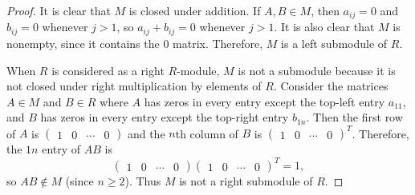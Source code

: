 \documentclass[10pt]{article}
\begin{document}
\begin{enumerate}
\begin{proof}
It is clear that $M$ is closed under addition.  If $A,B \in M$, then $a_{ij} = 0$ and $b_{ij} = 0$ whenever $j > 1$, so $a_{ij} + b_{ij} = 0$ whenever $j > 1$.  It is also clear that $M$ is nonempty, since it contains the $0$ matrix.  Therefore, $M$ is a left submodule of $R$.

When $R$ is considered as a right $R$-module, $M$ is not a submodule because it is not closed under right multiplication by elements of $R$.  Consider the matrices $A \in M$ and $B \in R$ where $A$ has zeros in every entry except the top-left entry $a_{11}$, and $B$ has zeros in every entry except the top-right entry $b_{1n}$.  Then the first row of $A$ is $\begin{pmatrix}
1 & 0 & \cdots & 0
\end{pmatrix}$
and the $n$th column of $B$ is
$\begin{pmatrix}
1 & 0 & \cdots & 0
\end{pmatrix}^T$.  Therefore, the $1n$ entry of $AB$ is
$$\begin{pmatrix}
1 & 0 & \cdots & 0
\end{pmatrix}
\begin{pmatrix}
1 & 0 & \cdots & 0
\end{pmatrix}^T
= 1,$$
so $AB \not \in M$ (since $n \geq 2$).  Thus $M$ is not a right submodule of $R$.
\end{proof}

\end{enumerate}
\end{document}
